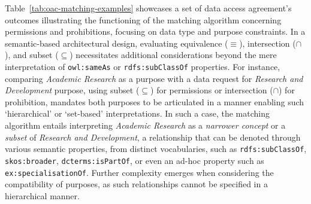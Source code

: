 Table~\ref{tab:oac-matching-examples} showcases a set of data access agreement's outcomes illustrating the functioning of the matching algorithm concerning permissions and prohibitions, focusing on data type and purpose constraints.
In a semantic-based architectural design, evaluating equivalence ($\equiv$), intersection ($\cap$), and subset ($\subseteq$) necessitates additional considerations beyond the mere interpretation of \texttt{owl:sameAs} or \texttt{rdfs:subClassOf} properties. 
For instance, comparing \textit{Academic Research} as a purpose with a data request for \textit{Research and Development} purpose, using subset ($\subseteq$) for permissions or intersection ($\cap$) for prohibition, mandates both purposes to be articulated in a manner enabling such `hierarchical' or `set-based' interpretations.
In such a case, the matching algorithm entails interpreting \textit{Academic Research} as a \textit{narrower concept} or a \textit{subset} of \textit{Research and Development}, a relationship that can be denoted through various semantic properties, from distinct vocabularies, such as \texttt{rdfs:subClassOf}, \texttt{skos:broader}, \texttt{dcterms:isPartOf}, or even an ad-hoc property such as \texttt{ex:specialisationOf}.
Further complexity emerges when considering the compatibility of purposes, as such relationships cannot be specified in a hierarchical manner.

